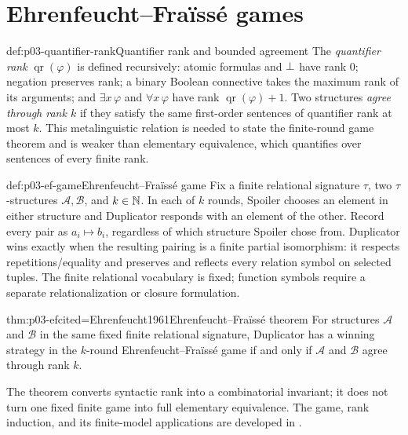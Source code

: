 \section{Ehrenfeucht--Fra\"iss\'e games}
\label{sec:p03-ef-games}

\begin{hbdefinition}{def:p03-quantifier-rank}{Quantifier rank and bounded agreement}
The \emph{quantifier rank} \(\operatorname{qr}(\varphi)\) is defined
recursively: atomic formulas and \(\bot\) have rank \(0\); negation preserves rank; a
binary Boolean connective takes the maximum rank of its arguments; and
\(\exists x\,\varphi\) and \(\forall x\,\varphi\) have rank
\(\operatorname{qr}(\varphi)+1\).  Two structures \emph{agree through rank
\(k\)} if they satisfy the same first-order sentences of quantifier rank at
most \(k\).  This metalinguistic relation is needed to state the finite-round
game theorem and is weaker than elementary equivalence, which quantifies over
sentences of every finite rank.
\end{hbdefinition}

\begin{hbdefinition}{def:p03-ef-game}{Ehrenfeucht--Fra\"iss\'e game}
Fix a finite relational signature \(\tau\), two \(\tau\)-structures
\(\mathcal A,\mathcal B\), and \(k\in\mathbb{N}\).  In each of \(k\) rounds,
Spoiler chooses an element in either structure and Duplicator responds with an
element of the other.  Record every pair as \(a_i\mapsto b_i\), regardless of
which structure Spoiler chose from.  Duplicator wins exactly when the resulting
pairing is a finite partial isomorphism: it respects repetitions/equality and
preserves and reflects every relation symbol on selected tuples.  The finite
relational vocabulary is fixed; function symbols require a separate
relationalization or closure formulation.
\end{hbdefinition}

\begin{hbtheorem}{thm:p03-ef}{cited=Ehrenfeucht1961}{Ehrenfeucht--Fra\"iss\'e theorem}
For structures \(\mathcal A\) and \(\mathcal B\) in the same fixed finite
relational signature, Duplicator has a winning strategy in the \(k\)-round
Ehrenfeucht--Fra\"iss\'e game if and only if \(\mathcal A\) and
\(\mathcal B\) agree through rank \(k\).
\end{hbtheorem}

The theorem converts syntactic rank into a combinatorial invariant; it does
not turn one fixed finite game into full elementary equivalence.  The game,
rank induction, and its finite-model applications are developed in
\cite{Ehrenfeucht1961,Libkin2004}.

